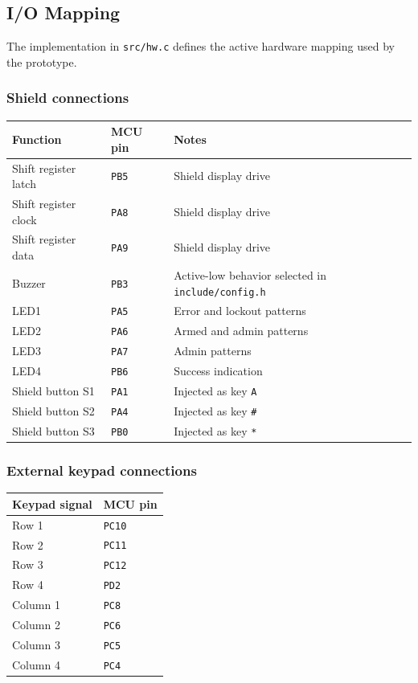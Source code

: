\documentclass[11pt,a4paper]{article}
\begin{document}
\subsection{I/O Mapping}

The implementation in \texttt{src/hw.c} defines the active hardware mapping used by the prototype.

\subsubsection*{Shield connections}

\begin{tabularx}{\textwidth}{l l X}
\toprule
\textbf{Function} & \textbf{MCU pin} & \textbf{Notes} \\
\midrule
Shift register latch & \texttt{PB5} & Shield display drive \\
Shift register clock & \texttt{PA8} & Shield display drive \\
Shift register data & \texttt{PA9} & Shield display drive \\
Buzzer & \texttt{PB3} & Active-low behavior selected in \texttt{include/config.h} \\
LED1 & \texttt{PA5} & Error and lockout patterns \\
LED2 & \texttt{PA6} & Armed and admin patterns \\
LED3 & \texttt{PA7} & Admin patterns \\
LED4 & \texttt{PB6} & Success indication \\
Shield button S1 & \texttt{PA1} & Injected as key \texttt{A} \\
Shield button S2 & \texttt{PA4} & Injected as key \texttt{\#} \\
Shield button S3 & \texttt{PB0} & Injected as key \texttt{*} \\
\bottomrule
\end{tabularx}

\subsubsection*{External keypad connections}

\begin{tabularx}{0.6\textwidth}{l l}
\toprule
\textbf{Keypad signal} & \textbf{MCU pin} \\
\midrule
Row 1 & \texttt{PC10} \\
Row 2 & \texttt{PC11} \\
Row 3 & \texttt{PC12} \\
Row 4 & \texttt{PD2} \\
Column 1 & \texttt{PC8} \\
Column 2 & \texttt{PC6} \\
Column 3 & \texttt{PC5} \\
Column 4 & \texttt{PC4} \\
\bottomrule
\end{tabularx}
\end{document}
